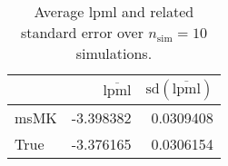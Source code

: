 \begin{table}[H]

\caption{Average lpml and related standard error over $n_{\text{sim}} = 10$ simulations.}
\centering
\begin{tabular}[t]{lrr}
\toprule
  & $\overbar{\text{lpml}}$ & $\text{sd}(\overbar{\text{lpml}})$\\
\midrule
msMK & -3.398382 & 0.0309408\\
True & -3.376165 & 0.0306154\\
\bottomrule
\end{tabular}
\end{table}